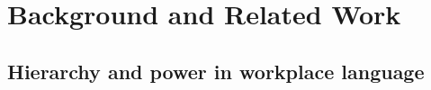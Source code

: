 \chapter{Background and Related Work}
\label{ch:background}

\section{Hierarchy and power in workplace language}




